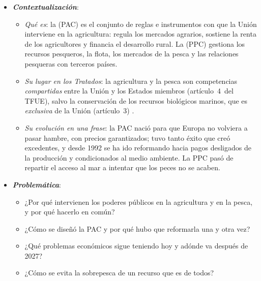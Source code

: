 \documentclass[11pt]{article}
\begin{document}
\begin{itemize}
\item \textbf{\emph{Contextualización}}:
  \begin{itemize}
  \item \emph{Qué es}: la  (PAC) es el conjunto de reglas e instrumentos con que la Unión interviene en la agricultura: regula los mercados agrarios, sostiene la renta de los agricultores y financia el desarrollo rural. La  (PPC) gestiona los recursos pesqueros, la flota, los mercados de la pesca y las relaciones pesqueras con terceros países.
  \item \emph{Su lugar en los Tratados}: la agricultura y la pesca son competencias \emph{compartidas} entre la Unión y los Estados miembros (artículo~4~del TFUE), salvo la conservación de los recursos biológicos marinos, que es \emph{exclusiva} de la Unión (artículo~3)\nocite{UE2016TFUE} .
  \item \emph{Su evolución en una frase}: la PAC nació para que Europa no volviera a pasar hambre, con precios garantizados; tuvo tanto éxito que creó excedentes, y desde 1992 se ha ido reformando hacia pagos desligados de la producción y condicionados al medio ambiente. La PPC pasó de repartir el acceso al mar a intentar que los peces no se acaben.
  \end{itemize}

\item \textbf{\emph{Problemática}}:
  \begin{itemize}
  \item ¿Por qué intervienen los poderes públicos en la agricultura y en la pesca, y por qué hacerlo en común?
  \item ¿Cómo se diseñó la PAC y por qué hubo que reformarla una y otra vez?
  \item ¿Qué problemas económicos sigue teniendo hoy y adónde va después de 2027?
  \item ¿Cómo se evita la sobrepesca de un recurso que es de todos?
  \end{itemize}


\end{itemize}
\end{document}
